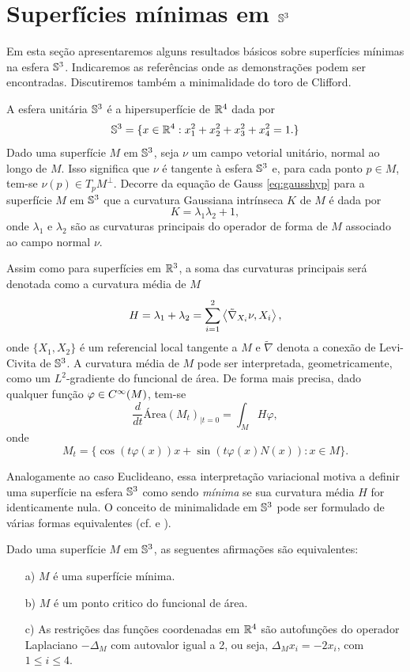 \section{Superfícies mínimas em $\mathbb{S}^3$}

Em esta seção apresentaremos alguns resultados básicos sobre superfícies mínimas na esfera $\mathbb{S}^3$. Indicaremos as referências onde as demonstrações podem ser encontradas. Discutiremos também a minimalidade do toro de Clifford.

A esfera unitária $\mathbb{S}^3$ é a hipersuperfície de $\mathbb{R}^4$ dada por
\[ \mathbb{S}^3 = \{ x \in \mathbb{R}^4: x_1^2 + x_2^2 + x_3^2 + x_4^2 = 1. \} \]
Dado uma superfície $M$ em $\mathbb{S}^3$, seja $\nu$ um campo vetorial unitário, normal ao longo de $M$. Isso significa que $\nu$ é tangente à esfera $\mathbb{S}^3$ e, para cada ponto $p \in M$, tem-se $\nu(p) \in T_p M^\perp$. Decorre da equação de Gauss \eqref{eq:gausshyp} para a superfície $M$ em $\mathbb{S}^3$ que a curvatura Gaussiana intrínseca $K$ de $M$ é dada por
\[ K = \lambda_1 \lambda_2 + 1, \]
onde $\lambda_1$ e $\lambda_2$ são as curvaturas principais do operador de forma de $M$ associado ao campo normal $\nu$.

Assim como para superfícies em $\mathbb{R}^3$, a soma das curvaturas principais será denotada como a curvatura média de $M$
\[ H = \lambda_1 + \lambda_2 = \sum_{i=1}^{2} \left\langle \tilde{\nabla}_{X_i} \nu,X_i \right\rangle, \]
onde $\{X_1,X_2\}$ é um referencial local tangente a $M$ e $\tilde{\nabla}$ denota a conexão de Levi-Civita de $\mathbb{S}^3$. A curvatura média de $M$ pode ser interpretada, geometricamente, como um $L^2$-gradiente do funcional de área. De forma mais precisa, dado qualquer função $\varphi \in C^\infty(M)$, tem-se
\[ \frac{d}{dt} \text{Área} (M_t)_{|t=0} = \int_M H \varphi, \]
onde
\[ M_t = \{ \cos(t \varphi(x))x + \sin(t \varphi(x) N(x)): x \in M \}. \]

Analogamente ao caso Euclideano, essa interpretação variacional motiva a definir uma superfície na esfera $\mathbb{S}^3$ como sendo \emph{mínima} se sua curvatura média $H$ for identicamente nula. O conceito de minimalidade em $\mathbb{S}^3$ pode ser formulado de várias formas equivalentes (cf. \cite[Theorem 3.2.1]{Simons1968} e \cite{Dajczer2019}).

\begin{teorema}\label{propriedades_sup_min_S3}
	Dado uma superfície $M$ em $\mathbb{S}^3$, as seguentes afirmações são equivalentes:
	\begin{enumerate}
		\item[a)] $M$ é uma superfície mínima.
		\item[b)] $M$ é um ponto critico do funcional de área.
		\item[c)] As restrições das funções coordenadas em $\mathbb{R}^4$ são autofunções do operador Laplaciano $-\Delta_M$ com autovalor igual a 2, ou seja, $\Delta_M x_i = -2 x_i$, com $1 \leq i \leq 4$.
	\end{enumerate}
\end{teorema}


